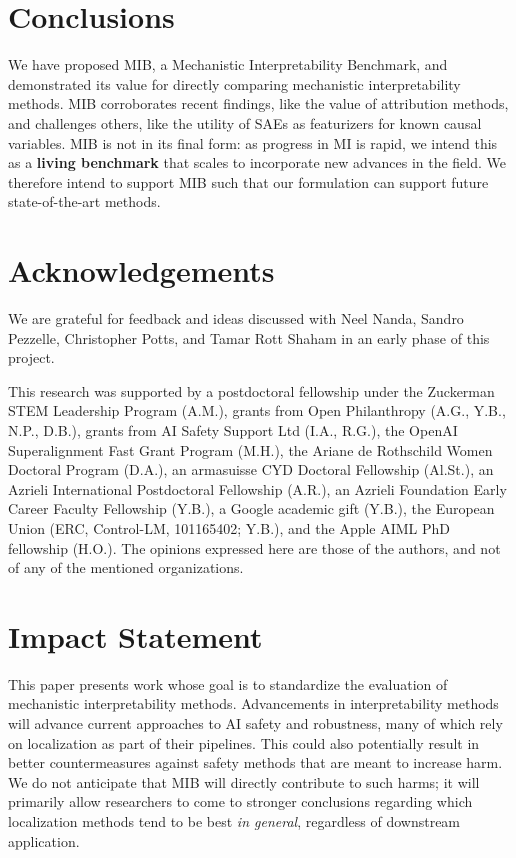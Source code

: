 \documentclass{article}
\theoremstyle{plain}
\theoremstyle{definition}
\theoremstyle{remark}
\newcommand{\mib}{\textsf{MIB}}
\newcommand{\fullnameA}{a Mechanistic Interpretability Benchmark}
\begin{document}
\section{Conclusions}
We have proposed \mib, \fullnameA{}, and demonstrated its value for directly comparing mechanistic interpretability methods. \mib{} corroborates recent findings, like the value of attribution methods, and challenges others, like the utility of SAEs as featurizers for known causal variables. \mib{} is not in its final form: as progress in MI is rapid, we intend this as a \textbf{living benchmark} that scales to incorporate new advances in the field.  We therefore intend to support \mib{} such that our formulation can support future state-of-the-art methods.

\section*{Acknowledgements}
We are grateful for feedback and ideas discussed with Neel Nanda, Sandro Pezzelle, Christopher Potts, and Tamar Rott Shaham in an early phase of this project.

This research was supported by a postdoctoral fellowship under the Zuckerman STEM Leadership Program (A.M.), grants from Open Philanthropy (A.G., Y.B., N.P., D.B.), grants from AI Safety Support Ltd (I.A., R.G.), the OpenAI Superalignment Fast Grant Program (M.H.), the Ariane de Rothschild Women Doctoral Program (D.A.), an armasuisse CYD Doctoral Fellowship (Al.St.), an Azrieli International Postdoctoral Fellowship (A.R.), an Azrieli Foundation Early Career Faculty Fellowship (Y.B.), a Google academic gift (Y.B.), the European Union (ERC, Control-LM, 101165402; Y.B.), and the Apple AIML PhD fellowship (H.O.). The opinions expressed here are those of the authors, and not of any of the mentioned organizations.

\section*{Impact Statement}
This paper presents work whose goal is to standardize the evaluation of mechanistic interpretability methods. Advancements in interpretability methods will advance current approaches to AI safety and robustness, many of which rely on localization as part of their pipelines. This could also potentially result in better countermeasures against safety methods that are meant to increase harm. We do not anticipate that \mib{} will directly contribute to such harms; it will primarily allow researchers to come to stronger conclusions regarding which localization methods tend to be best \emph{in general}, regardless of downstream application.
\end{document}
